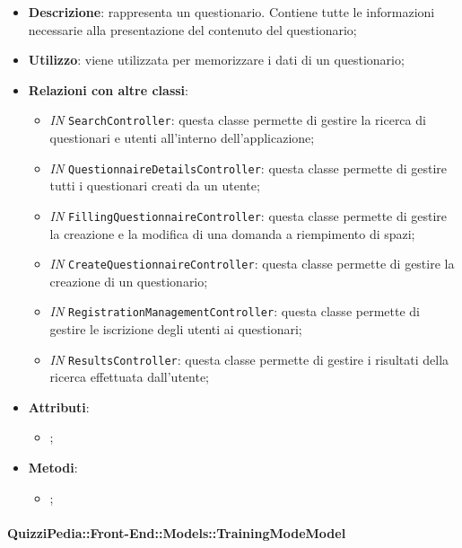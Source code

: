 		\begin{itemize}
			\item \textbf{Descrizione}: rappresenta un questionario. Contiene tutte le informazioni necessarie alla
			presentazione del contenuto del questionario;
			\item \textbf{Utilizzo}: viene utilizzata per memorizzare i dati di un questionario;
			\item \textbf{Relazioni con altre classi}: 
			\begin{itemize}
				\item \textit{IN} \texttt{SearchController}: questa classe permette di gestire la ricerca di questionari e utenti all'interno dell'applicazione;
				\item \textit{IN} \texttt{QuestionnaireDetailsController}: questa classe permette di gestire tutti i questionari creati da un utente; 
				\item \textit{IN} \texttt{FillingQuestionnaireController}: questa classe permette di gestire la creazione e la modifica di una domanda a riempimento di spazi;
				\item \textit{IN} \texttt{CreateQuestionnaireController}: questa classe permette di gestire la creazione di un questionario;
				\item \textit{IN} \texttt{RegistrationManagementController}: questa classe permette di gestire le iscrizione degli utenti ai questionari;
				\item \textit{IN} \texttt{ResultsController}: questa classe permette di gestire i risultati della ricerca effettuata dall'utente;
			\end{itemize}
			\item \textbf{Attributi}: 
			\begin{itemize}
				\item ;
			\end{itemize}
			\item \textbf{Metodi}: 
			\begin{itemize}
				\item ;
			\end{itemize}
		\end{itemize}	
		
		\paragraph{QuizziPedia::Front-End::Models::TrainingModeModel}
		
		\label{QuizziPedia::Front-End::Models::TrainingModeModel}
		
